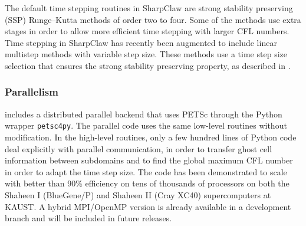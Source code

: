 The default time stepping routines in SharpClaw are strong stability
preserving (SSP) Runge--Kutta methods of order two to four.
Some of the methods use extra stages in order to allow more efficient
time stepping with larger CFL numbers.
Time stepping in SharpClaw has recently been augmented to include
linear multistep methods with variable step size.  These methods use
a time step size selection that ensures the strong stability preserving
property, as described in \cite{ssp_lmm_vss}.

\subsubsection{Parallelism}
\pyclaw includes a distributed parallel backend that uses PETSc through
the Python wrapper {\tt petsc4py}.  The parallel code uses the same low-level
routines without modification.  In the high-level routines, only a few
hundred lines of Python code deal explicitly with parallel communication,
in order to transfer ghost cell information between subdomains and to
find the global maximum CFL number in order to adapt the time step
size.  The code has been demonstrated to scale with better than 90\%
efficiency on tens of thousands of processors on both the Shaheen I
(BlueGene/P) and Shaheen II (Cray XC40) supercomputers at KAUST.
A hybrid MPI/OpenMP version is already available in a development branch
and will be included in future releases.
